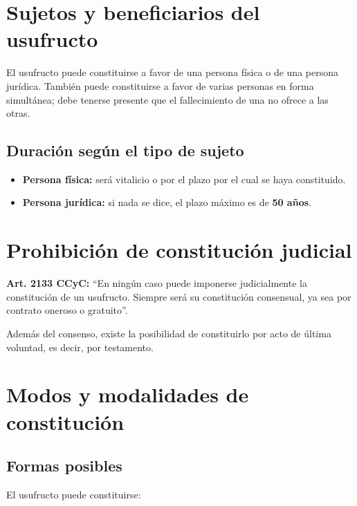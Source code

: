 \documentclass[12pt,oneside]{book}
\begin{document}
\section{Sujetos y beneficiarios del usufructo}

El usufructo puede constituirse a favor de una persona física o de una persona jurídica. También puede constituirse a favor de varias personas en forma simultánea; debe tenerse presente que el fallecimiento de una no ofrece a las otras.

\subsection{Duración según el tipo de sujeto}

\begin{itemize}
    \item \textbf{Persona física:} será vitalicio o por el plazo por el cual se haya constituido.
    \item \textbf{Persona jurídica:} si nada se dice, el plazo máximo es de \textbf{50 años}.
\end{itemize}

\section{Prohibición de constitución judicial}

\begin{important}
\textbf{Art. 2133 CCyC:} ``En ningún caso puede imponerse judicialmente la constitución de un usufructo. Siempre será su constitución consensual, ya sea por contrato oneroso o gratuito''.
\end{important}

Además del consenso, existe la posibilidad de constituirlo por acto de última voluntad, es decir, por testamento.

\section{Modos y modalidades de constitución}

\subsection{Formas posibles}

El usufructo puede constituirse:
\end{document}
